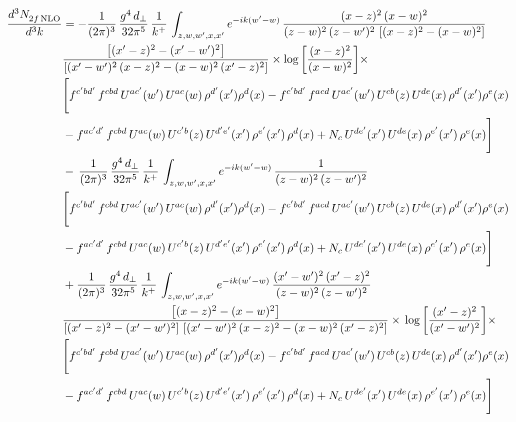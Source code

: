 \documentclass[9pt]{article}
\numberwithin{equation}{section}
\begin{document}
\begin{align}
    \frac{d^{3}N_{2f\,\rm NLO}^{\rm}}{d^{3}k}  & =   - \frac{1}{(2\pi)^{3}}\, \frac{g^{4}\,d_{\perp}}{32\pi^{5}}\,\frac{1}{k^{+}}\,\int_{z,w,w^{\prime},x,x'} e^{-ik(w^{\prime}-w)}\,\frac{(x-z)^{2}\, (x-w)^{2}}{(z-w)^{2}\, (z-w')^{2}\,\left[(x-z)^{2} - (x-w)^{2}\right]}\notag \\ & \frac{\left[(x'-z)^{2}-(x'-w')^{2}\right]}{\left[(x'-w')^{2}\, (x-z)^{2} - (x-w)^{2}\, (x'-z)^{2}\right]}\times \log{\left[\frac{(x-z)^{2}}{(x-w)^{2}}\right]}\times\notag \\ & \Bigg[f^{c'bd'}\,f^{cbd}\, U^{ac'}(w')\,U^{ac}(w)\,\rho^{d'}(x')\rho^{d}(x)- f^{c'bd'}\,f^{acd}\,U^{ac'}(w')\,U^{cb}(z)\,U^{de}(x)\,\rho^{d'}(x')\rho^{e}(x) \notag \\ & -f^{ac'd'}\,f^{cbd}\,U^{ac}(w)\,U^{c'b}(z)\,U^{d'e'}(x')\,\rho^{e'}(x')\,\rho^{d}(x) +N_{c}\,U^{de'}(x')\,U^{de}(x)\,\rho^{e'}(x')\,\rho^{e}(x)\Bigg]  \notag \\
& -\, \frac{1}{(2\pi)^{3}}\, \frac{g^{4}\,d_{\perp}}{32\pi^{5}}\,\frac{1}{k^{+}}\,\int_{z,w,w^{\prime},x,x'} e^{-ik(w^{\prime}-w)}\,\frac{1}{(z-w)^{2}\, (z-w')^{2}}\notag \\ & \Bigg[f^{c'bd'}\,f^{cbd}\, U^{ac'}(w')\,U^{ac}(w)\,\rho^{d'}(x')\rho^{d}(x)- f^{c'bd'}\,f^{acd}\,U^{ac'}(w')\,U^{cb}(z)\,U^{de}(x)\,\rho^{d'}(x')\rho^{e}(x) \notag \\ & -f^{ac'd'}\,f^{cbd}\,U^{ac}(w)\,U^{c'b}(z)\,U^{d'e'}(x')\,\rho^{e'}(x')\,\rho^{d}(x) +N_{c}\,U^{de'}(x')\,U^{de}(x)\,\rho^{e'}(x')\,\rho^{e}(x)\Bigg]  \notag \\
& + \frac{1}{(2\pi)^{3}}\, \frac{g^{4}\,d_{\perp}}{32\pi^{5}}\,\frac{1}{k^{+}}\,\int_{z,w,w^{\prime},x,x'} e^{-ik(w^{\prime}-w)}\,\frac{(x'-w')^{2}\, (x'-z)^{2}}{(z-w)^{2}\, (z-w')^{2}}\notag \\ & \frac{\left[(x-z)^{2} - (x-w)^{2}\right]}{\left[(x'-z)^{2} - (x'-w')^{2}\right]\, \left[(x'-w')^{2}\, (x - z)^{2} - (x-w)^{2}\,(x'-z)^{2}\right]}\times\, \log{\left[\frac{(x'-z)^{2}}{(x'-w')^{2}}\right]}\times \notag \\ &  \Bigg[f^{c'bd'}\,f^{cbd}\, U^{ac'}(w')\,U^{ac}(w)\,\rho^{d'}(x')\rho^{d}(x)- f^{c'bd'}\,f^{acd}\,U^{ac'}(w')\,U^{cb}(z)\,U^{de}(x)\,\rho^{d'}(x')\rho^{e}(x) \notag \\ & -f^{ac'd'}\,f^{cbd}\,U^{ac}(w)\,U^{c'b}(z)\,U^{d'e'}(x')\,\rho^{e'}(x')\,\rho^{d}(x) +N_{c}\,U^{de'}(x')\,U^{de}(x)\,\rho^{e'}(x')\,\rho^{e}(x)\Bigg]
\end{align}
\end{document}
